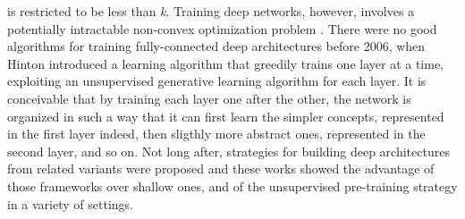 is restricted to be less than \textit{k}. Training deep networks, however, involves a potentially 
intractable non-convex optimization problem \cite{bengio2009curriculum}. There were no good algorithms for training 
fully-connected deep architectures before 2006, when Hinton introduced a learning algorithm that greedily trains one layer at a time, exploiting an unsupervised
generative learning algorithm for each layer. It is conceivable that by training 
each layer one after the other, the network is organized in such a way that it can first learn the simpler
concepts, represented in the first layer indeed, then sligthly more abstract ones, represented in the second layer, and so on.
Not long after, strategies for building deep architectures from related variants were proposed %
and these works showed the advantage of those frameworks over shallow ones, and of the unsupervised 
pre-training strategy in a variety of settings.\\


